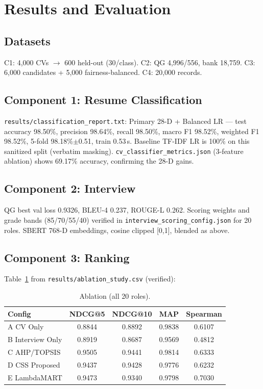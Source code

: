 \documentclass[conference]{IEEEtran}
\begin{document}
\section{Results and Evaluation}
\subsection{Datasets}
C1: 4,000 CVs $\rightarrow$ 600 held-out (30/class). C2: QG 4,996/556, bank 18,759. C3: 6,000 candidates + 5,000 fairness-balanced. C4: 20,000 records.

\subsection{Component 1: Resume Classification}
\texttt{results/classification\_report.txt}: Primary 28-D + Balanced LR — test accuracy 98.50\%, precision 98.64\%, recall 98.50\%, macro F1 98.52\%, weighted F1 98.52\%, 5-fold 98.18\%$\pm$0.51, train 0.53\,s. Baseline TF-IDF LR is 100\% on this sanitized split (verbatim masking). \texttt{cv\_classifier\_metrics.json} (3-feature ablation) shows 69.17\% accuracy, confirming the 28-D gains.

\subsection{Component 2: Interview}
QG best val loss 0.9326, BLEU-4 0.237, ROUGE-L 0.262. Scoring weights and grade bands (85/70/55/40) verified in \texttt{interview\_scoring\_config.json} for 20 roles. SBERT 768-D embeddings, cosine clipped [0,1], blended as above.

\subsection{Component 3: Ranking}
Table~\ref{tab:main} from \texttt{results/ablation\_study.csv} (verified):

\begin{table}[htbp]
\caption{Ablation (all 20 roles).}
\begin{center}
\begin{tabular}{lcccc}
\toprule
Config & NDCG@5 & NDCG@10 & MAP & Spearman \\
\midrule
A CV Only & 0.8844 & 0.8892 & 0.9838 & 0.6107 \\
B Interview Only & 0.8919 & 0.8687 & 0.9569 & 0.4812 \\
C AHP/TOPSIS & 0.9505 & 0.9441 & 0.9814 & 0.6333 \\
D CSS Proposed & 0.9437 & 0.9428 & 0.9776 & 0.6232 \\
E LambdaMART & 0.9473 & 0.9340 & 0.9798 & 0.7030 \\
\bottomrule
\end{tabular}
\end{center}
\label{tab:main}
\end{table}
\end{document}
